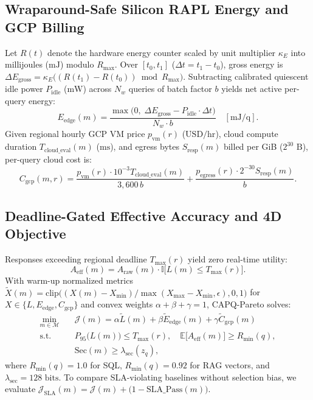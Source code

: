 \documentclass[10pt,journal,compsoc]{IEEEtran}
\begin{document}
\subsection{Wraparound-Safe Silicon RAPL Energy and GCP Billing}
Let $R(t)$ denote the hardware energy counter scaled by unit multiplier $\kappa_E$ into millijoules ($\text{mJ}$) modulo $R_{\max}$. Over $[t_0, t_1]$ ($\Delta t = t_1 - t_0$), gross energy is $\Delta E_{\text{gross}} = \kappa_E\big((R(t_1)-R(t_0))\bmod R_{\max}\big)$. Subtracting calibrated quiescent idle power $P_{\text{idle}}$ ($\text{mW}$) across $N_w$ queries of batch factor $b$ yields net active per-query energy:
\begin{equation}
E_{\text{edge}}(m) = \frac{\max\!\big(0,\; \Delta E_{\text{gross}} - P_{\text{idle}}\cdot\Delta t\big)}{N_w \cdot b} \quad [\text{mJ/q}].
\label{eq:net_energy}
\end{equation}
Given regional hourly GCP VM price $p_{\text{vm}}(r)$ ($\text{USD/hr}$), cloud compute duration $T_{\text{cloud\_eval}}(m)$ ($\text{ms}$), and egress bytes $S_{\text{resp}}(m)$ billed per GiB ($2^{30}\text{ B}$), per-query cloud cost is:
\begin{equation}
C_{\text{gcp}}(m, r) = \frac{p_{\text{vm}}(r)\cdot 10^{-3} T_{\text{cloud\_eval}}(m)}{3{,}600\, b} + \frac{p_{\text{egress}}(r)\cdot 2^{-30} S_{\text{resp}}(m)}{b}.
\label{eq:gcp_cost}
\end{equation}

\subsection{Deadline-Gated Effective Accuracy and 4D Objective}
Responses exceeding regional deadline $T_{\max}(r)$ yield zero real-time utility:
\begin{equation}
A_{\text{eff}}(m) = A_{\text{raw}}(m) \cdot \mathbb{I}\!\big[L(m) \le T_{\max}(r)\big].
\label{eq:eff_acc}
\end{equation}
With warm-up normalized metrics $\tilde{X}(m) = \text{clip}\big((X(m)-X_{\min})/\max(X_{\max}-X_{\min}, \epsilon), 0, 1\big)$ for $X \in \{L, E_{\text{edge}}, C_{\text{gcp}}\}$ and convex weights $\alpha + \beta + \gamma = 1$, CAPQ-Pareto solves:
\begin{align}
\min_{m \in \mathcal{M}} \quad & \mathcal{J}(m) = \alpha \tilde{L}(m) + \beta \tilde{E}_{\text{edge}}(m) + \gamma \tilde{C}_{\text{gcp}}(m) \label{eq:pareto_obj}\\
\text{s.t.} \quad & P_{95}\!\big(L(m)\big) \le T_{\max}(r), \quad \mathbb{E}\!\big[A_{\text{eff}}(m)\big] \ge R_{\min}(q), \nonumber\\
                  & \text{Sec}(m) \ge \lambda_{\text{sec}}(z_q), \label{eq:const_acc}
\end{align}
where $R_{\min}(q) = 1.0$ for SQL, $R_{\min}(q) = 0.92$ for RAG vectors, and $\lambda_{\text{sec}} = 128\text{ bits}$. To compare SLA-violating baselines without selection bias, we evaluate $\mathcal{J}_{\text{SLA}}(m) = \mathcal{J}(m) + \big(1 - \text{SLA\_Pass}(m)\big)$.
\end{document}
